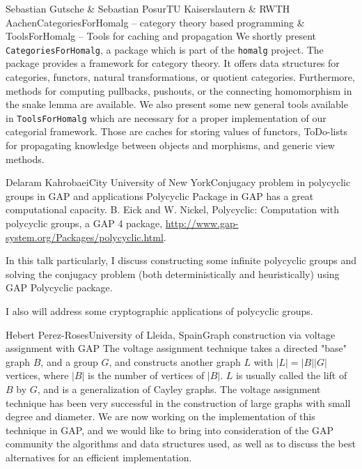 \documentclass[12pt,a4paper]{article}
\begin{document}
\begin{Abstract}{Sebastian Gutsche \& Sebastian Posur}{TU Kaiserslautern \& RWTH Aachen}{CategoriesForHomalg -- category theory based programming \& ToolsForHomalg -- Tools for caching and propagation}
We shortly present \texttt{CategoriesForHomalg}, a package which is part of the \texttt{homalg} project.
The package provides a framework for category theory.
It offers data structures for categories, functors, natural transformations, or quotient categories.
Furthermore, methods for computing pullbacks, pushouts, or the connecting homomorphism in the snake lemma
are available.
We also present some new general tools available in \texttt{ToolsForHomalg} which are necessary for 
a proper implementation of our categorial framework.
Those are caches for storing values of functors, ToDo-lists for propagating knowledge between objects and morphisms,
and generic view methods.
\end{Abstract}


\begin{Abstract}{Delaram Kahrobaei}{City University of New York}{Conjugacy problem in polycyclic groups in GAP and applications}
Polycyclic Package in GAP has a great computational capacity.
B. Eick and W. Nickel, Polycyclic: Computation with polycyclic groups, a GAP 4 package, \url{http://www.gap-system.org/Packages/polycyclic.html}.

In this talk particularly, I discuss constructing some infinite polycyclic groups and solving the conjugacy problem (both deterministically and heuristically) using GAP Polycyclic package. 

I also will address some cryptographic applications of polycyclic groups.
\end{Abstract}


\begin{Abstract}{Hebert Perez-Roses}{University of Lleida, Spain}{Graph construction via voltage assignment with GAP}
The voltage assignment technique takes a directed "base" graph $B$, and a
group $G$, and constructs another graph $L$ with $|L|=|B||G|$ vertices, where
$|B|$ is the number of vertices of $|B|$. $L$ is usually called the lift of $B$
by $G$, and is a generalization of Cayley graphs. The voltage assignment
technique has been very successful in the construction of large graphs
with small degree and diameter. We are now working on the implementation
of this technique in GAP, and we would like to bring into consideration
of the GAP community the algorithms and data structures used, as well as
to discuss the best alternatives for an efficient implementation.
\end{Abstract}
\end{document}
